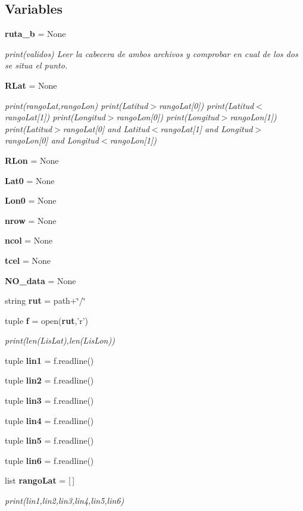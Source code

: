 \subsection*{Variables}
\begin{DoxyCompactItemize}
\item 
{\bf ruta\-\_\-b} = None
\begin{DoxyCompactList}\small\item\em print(validos) Leer la cabecera de ambos archivos y comprobar en cual de los dos se situa el punto. \end{DoxyCompactList}\item 
{\bf R\-Lat} = None
\begin{DoxyCompactList}\small\item\em print(rango\-Lat,rango\-Lon) print(\-Latitud$>$rango\-Lat[0]) print(\-Latitud$<$rango\-Lat[1]) print(\-Longitud$>$rango\-Lon[0]) print(\-Longitud$>$rango\-Lon[1]) print(\-Latitud$>$rango\-Lat[0] and Latitud$<$rango\-Lat[1] and Longitud$>$rango\-Lon[0] and Longitud$<$rango\-Lon[1]) \end{DoxyCompactList}\item 
{\bf R\-Lon} = None
\item 
{\bf Lat0} = None
\item 
{\bf Lon0} = None
\item 
{\bf nrow} = None
\item 
{\bf ncol} = None
\item 
{\bf tcel} = None
\item 
{\bf N\-O\-\_\-data} = None
\item 
string {\bf rut} = path+\char`\"{}/\char`\"{}
\item 
tuple {\bf f} = open({\bf rut},'r')
\begin{DoxyCompactList}\small\item\em print(len(\-Lis\-Lat),len(\-Lis\-Lon)) \end{DoxyCompactList}\item 
tuple {\bf lin1} = f.\-readline()
\item 
tuple {\bf lin2} = f.\-readline()
\item 
tuple {\bf lin3} = f.\-readline()
\item 
tuple {\bf lin4} = f.\-readline()
\item 
tuple {\bf lin5} = f.\-readline()
\item 
tuple {\bf lin6} = f.\-readline()
\item 
list {\bf rango\-Lat} = [$\,$]
\begin{DoxyCompactList}\small\item\em print(lin1,lin2,lin3,lin4,lin5,lin6) \end{DoxyCompactList}\item 

\end{DoxyCompactItemize}
